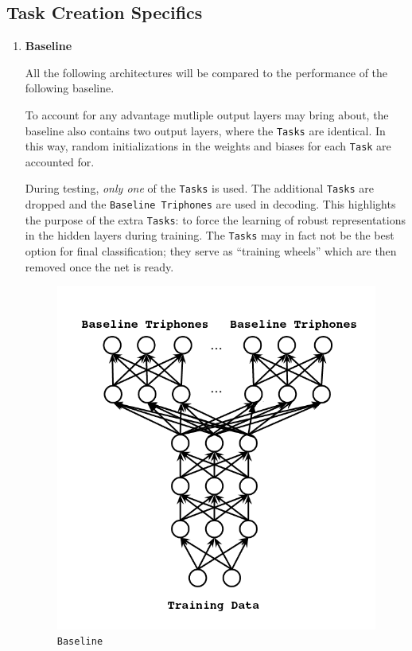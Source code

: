 \documentclass[10pt,a4paper]{article}
\begin{document}
\subsection{Task Creation Specifics}


\begin{enumerate}

\item \textbf{Baseline}

All the following architectures will be compared to the performance of the following baseline.

To account for any advantage mutliple output layers may bring about, the baseline also contains two output layers, where the \texttt{Tasks} are identical. In this way, random initializations in the weights and biases for each \texttt{Task} are accounted for.

During testing, \textit{only one} of the \texttt{Tasks} is used. The additional \texttt{Tasks} are dropped and the \texttt{Baseline Triphones} are used in decoding. This highlights the purpose of the extra \texttt{Tasks}: to force the learning of robust representations in the hidden layers during training. The \texttt{Tasks} may in fact not be the best option for final classification; they serve as ``training wheels'' which are then removed once the net is ready. 

\begin{figure}[!htb]
  \centering
{}
  \includegraphics[width=\linewidth]{figs/mtl-arch-baseline.png}
  \caption{\texttt{Baseline}}
\endminipage\hfill
\end{figure}




\end{enumerate}
\end{document}
